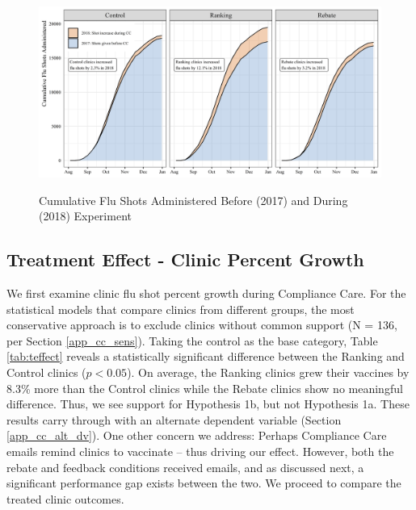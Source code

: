 \begin{figure}[htbp]
     \centering
     \caption{Cumulative Flu Shots Administered Before (2017) and During (2018) Experiment} %
     \includegraphics[scale=.75]{Figures/CC/CC_outcome_Fig1_color.png}     
     \label{fig:model_free_cc}
 \end{figure} 
 
 \subsection{Treatment Effect - Clinic Percent Growth} \label{cc_res_pctGrowth}
 We first examine clinic flu shot percent growth during Compliance Care. For the statistical models that compare clinics from different groups, the most conservative approach is to exclude clinics without common support (N = 136, per Section \ref{app_cc_sens}). Taking the control as the base category, Table \ref{tab:teffect} reveals a statistically significant difference between the Ranking and Control clinics ($p < 0.05$). On average, the Ranking clinics grew their vaccines by 8.3\% more than the Control clinics while the Rebate clinics show no meaningful difference. Thus, we see support for Hypothesis 1b, but not Hypothesis 1a. These results carry through with an alternate dependent variable (Section \ref{app_cc_alt_dv}). One other concern we address: Perhaps Compliance Care emails remind clinics to vaccinate – thus driving our effect. However, both the rebate and feedback conditions received emails, and as discussed next, a significant performance gap exists between the two. We proceed to compare the treated clinic outcomes.
 
